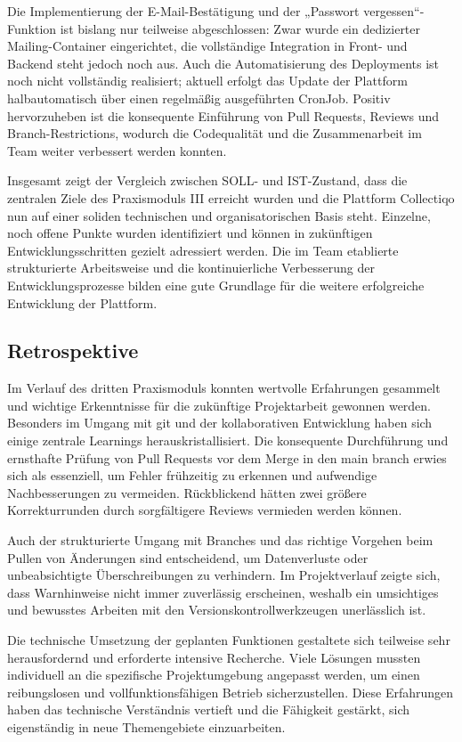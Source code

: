 Die Implementierung der E-Mail-Bestätigung und der „Passwort vergessen“-Funktion ist bislang nur teilweise abgeschlossen: Zwar wurde ein dedizierter Mailing-Container eingerichtet, die vollständige Integration in Front- und Backend steht jedoch noch aus.
Auch die Automatisierung des Deployments ist noch nicht vollständig realisiert; aktuell erfolgt das Update der Plattform halbautomatisch über einen regelmäßig ausgeführten CronJob.
Positiv hervorzuheben ist die konsequente Einführung von Pull Requests, Reviews und Branch-Restrictions, wodurch die Codequalität und die Zusammenarbeit im Team weiter verbessert werden konnten.

Insgesamt zeigt der Vergleich zwischen SOLL- und IST-Zustand, dass die zentralen Ziele des Praxismoduls III erreicht wurden und die Plattform Collectiqo nun auf einer soliden technischen und organisatorischen Basis steht.
Einzelne, noch offene Punkte wurden identifiziert und können in zukünftigen Entwicklungsschritten gezielt adressiert werden.
Die im Team etablierte strukturierte Arbeitsweise und die kontinuierliche Verbesserung der Entwicklungsprozesse bilden eine gute Grundlage für die weitere erfolgreiche Entwicklung der Plattform.


\subsection{Retrospektive}\label{subsec:retrospektive}

Im Verlauf des dritten Praxismoduls konnten wertvolle Erfahrungen gesammelt und wichtige Erkenntnisse für die zukünftige Projektarbeit gewonnen werden.
Besonders im Umgang mit git und der kollaborativen Entwicklung haben sich einige zentrale Learnings herauskristallisiert.
Die konsequente Durchführung und ernsthafte Prüfung von Pull Requests vor dem Merge in den main branch erwies sich als essenziell, um Fehler frühzeitig zu erkennen und aufwendige Nachbesserungen zu vermeiden.
Rückblickend hätten zwei größere Korrekturrunden durch sorgfältigere Reviews vermieden werden können.

Auch der strukturierte Umgang mit Branches und das richtige Vorgehen beim Pullen von Änderungen sind entscheidend, um Datenverluste oder unbeabsichtigte Überschreibungen zu verhindern.
Im Projektverlauf zeigte sich, dass Warnhinweise nicht immer zuverlässig erscheinen, weshalb ein umsichtiges und bewusstes Arbeiten mit den Versionskontrollwerkzeugen unerlässlich ist.

Die technische Umsetzung der geplanten Funktionen gestaltete sich teilweise sehr herausfordernd und erforderte intensive Recherche.
Viele Lösungen mussten individuell an die spezifische Projektumgebung angepasst werden, um einen reibungslosen und vollfunktionsfähigen Betrieb sicherzustellen.
Diese Erfahrungen haben das technische Verständnis vertieft und die Fähigkeit gestärkt, sich eigenständig in neue Themengebiete einzuarbeiten.

